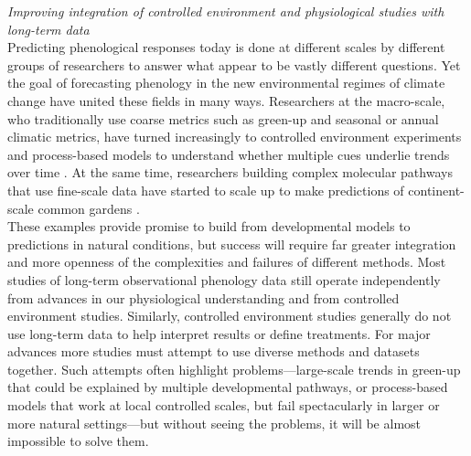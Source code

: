 \documentclass[11pt,letter]{article}
\newcommand{\R}[1]{\label{#1}\linelabel{#1}}
\begin{document}
\emph{Improving integration of controlled environment and physiological studies with long-term data}\\
\R{r2acrosscalesstart}Predicting phenological responses today is done at different scales by different groups of researchers to answer what appear to be vastly different questions. Yet the goal of forecasting phenology in the new environmental regimes of climate change have united these fields in many ways. Researchers at the macro-scale, who traditionally use coarse metrics such as green-up and seasonal or annual climatic metrics, have turned increasingly to controlled environment experiments and process-based models to understand whether multiple cues underlie trends over time \citep[e.g.,][]{fu2019}. At the same time, researchers building complex molecular pathways that use fine-scale data have started to scale up to make predictions of continent-scale common gardens \citep{Wilczek:2009oa}.\\

These examples provide promise to build from developmental models to predictions in natural conditions, but success will require far greater integration and more openness of the complexities and failures of different methods. Most studies of long-term observational phenology data still operate independently from advances in our physiological understanding and from controlled environment studies. Similarly, controlled environment studies generally do not use long-term data to help interpret results or define treatments. For major advances more studies must attempt to use diverse methods and datasets together. Such attempts often highlight problems---large-scale trends in green-up that could be explained by multiple developmental pathways, or process-based models that work at local controlled scales, but fail spectacularly in larger or more natural settings---but without seeing the problems, it will be almost impossible to solve them.\R{r2acrosscalesend}\\
\end{document}
